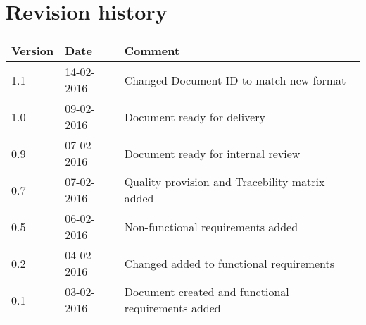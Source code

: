 \label{chp_revisionHistory}
\chapter{Revision history}

\begin{longtable}{| p{1.5cm}  | p{3cm} |  p{8cm} | }
    \hline
    \textbf{Version} & \textbf{Date} & \textbf{Comment} \\
    \hline
    1.1 & 14-02-2016 & Changed Document ID to match new format \\
    \hline
    1.0 & 09-02-2016 & Document ready for delivery \\
    \hline
    0.9 & 07-02-2016 & Document ready for internal review \\
    \hline
    0.7 & 07-02-2016 & Quality provision and Tracebility matrix added \\
    \hline
    0.5 & 06-02-2016 & Non-functional requirements added \\
    \hline
    0.2 & 04-02-2016 & Changed added to functional requirements \\
    \hline
    0.1 & 03-02-2016 & Document created and functional requirements added  \\
    \hline
\end{longtable}

